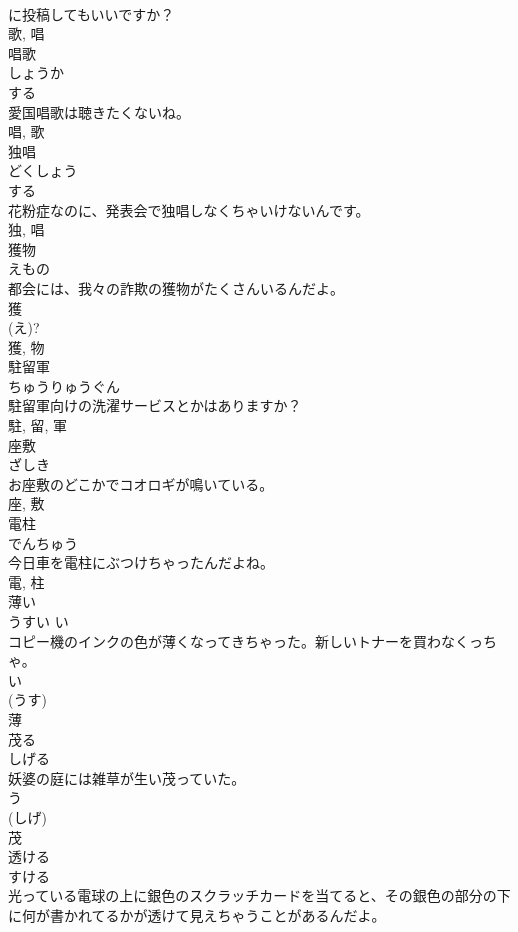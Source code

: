 \documentclass[8pt]{extreport}
\begin{document}
\begin{CJK}{UTF8}{min}
\\	に投稿してもいいですか？	
\\	歌, 唱	
\\	唱歌	
\\	しょうか	
\\	する 
\\	愛国唱歌は聴きたくないね。	
\\	唱, 歌	
\\	独唱	
\\	どくしょう	
\\	する 
\\	花粉症なのに、発表会で独唱しなくちゃいけないんです。	
\\	独, 唱	
\\	獲物	
\\	えもの	
\\	都会には、我々の詐欺の獲物がたくさんいるんだよ。	
\\	獲 
\\	(え)? 
\\	獲, 物	
\\	駐留軍	
\\	ちゅうりゅうぐん	
\\	駐留軍向けの洗濯サービスとかはありますか？	
\\	駐, 留, 軍	
\\	座敷	
\\	ざしき	
\\	お座敷のどこかでコオロギが鳴いている。	
\\	座, 敷	
\\	電柱	
\\	でんちゅう	
\\	今日車を電柱にぶつけちゃったんだよね。	
\\	電, 柱	
\\	薄い	
\\	うすい	い 
\\	コピー機のインクの色が薄くなってきちゃった。新しいトナーを買わなくっちゃ。	
\\	い 
\\	(うす) 
\\	薄	
\\	茂る	
\\	しげる	
\\	妖婆の庭には雑草が生い茂っていた。	
\\	う 
\\	(しげ) 
\\	茂	
\\	透ける	
\\	すける	
\\	光っている電球の上に銀色のスクラッチカードを当てると、その銀色の部分の下に何が書かれてるかが透けて見えちゃうことがあるんだよ。	

\end{CJK}
\end{document}
